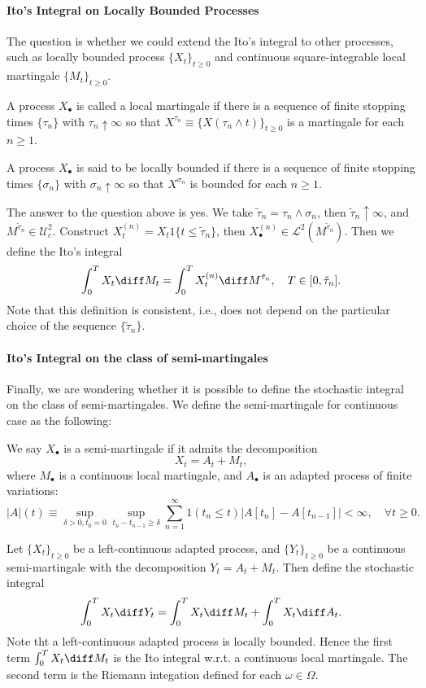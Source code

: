 \paragraph{Ito's Integral on Locally Bounded Processes}
The question is whether we could extend the Ito's integral to other processes, such as locally bounded process $\{X_t\}_{t\ge0}$ and continuous square-integrable local martingale $\{M_t\}_{t\ge0}$.
\begin{definition}
A process $X_{\bullet}$ is called a local martingale if there is a sequence of finite stopping times $\{\tau_n\}$ with $\tau_n\uparrow\infty$ so that $X^{\tau_n}\equiv\{X(\tau_n\land t)\}_{t\ge0}$ is a martingale for each $n\ge1$.
\end{definition}
\begin{definition}
A process $X_{\bullet}$ is said to be locally bounded if there is a sequence of finite stopping times $\{\sigma_n\}$ with $\sigma_n\uparrow\infty$ so that $X^{\sigma_n}$ is bounded for each $n\ge1$.
\end{definition}
The answer to the question above is yes.
We take $\tilde{\tau}_n=\tau_n\land \sigma_n$, then $\tilde{\tau}_n\uparrow\infty$, and $M^{\tilde{\tau}_n}\in\mathcal{U}_c^2$. Construct $X_t^{(n)}=X_t1\{t\le \tilde{\tau}_n\}$, then $X_{\bullet}^{(n)}\in\mathcal{L}^2(M^{\tilde{\tau}_n})$.
Then we define the Ito's integral
\[
\int_0^TX_t\diff M_t = \int_0^TX_t^{(n)}\diff M^{\tilde{\tau}_n},\quad T\in[0,\tilde{\tau}_n].
\]
Note that this definition is consistent, i.e., does not depend on the particular choice of the sequence $\{\tilde{\tau}_n\}$.
\paragraph{Ito's Integral on the class of semi-martingales}
Finally, we are wondering whether it is possible to define the stochastic integral on the class of semi-martingales. 
We define the semi-martingale for continuous case as the following:
\begin{definition}
We say $X_{\bullet}$ is a semi-martingale if it admits the decomposition
\[
X_t = A_t + M_t,
\]
where $M_{\bullet}$ is a continuous local martingale, and $A_{\bullet}$ is an adapted process of finite variations:
\[
|A|(t)\equiv\sup_{\delta>0, t_0=0}\sup_{t_n - t_{n-1}\ge\delta}
\sum_{n=1}^\infty1(t_n\le t)|A[t_n] - A[t_{n-1}]|<\infty,\quad\forall t\ge0.
\]
\end{definition}
Let $\{X_t\}_{t\ge0}$ be a left-continuous adapted process, and $\{Y_t\}_{t\ge0}$ be a continuous semi-martingale with the decomposition $Y_t = A_t+M_t$.
Then define the stochastic integral
\[
\int_0^TX_t\diff Y_t = \int_0^TX_t\diff M_t + \int_0^TX_t\diff A_t.
\]
Note tht a left-continuous adapted process is locally bounded. Hence the first term $\int_0^TX_t\diff M_t$ is the Ito integral w.r.t. a continuous local martingale.
The second term is the Riemann integation defined for each $\omega\in\Omega$.







